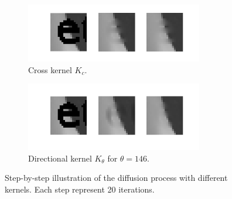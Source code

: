 \begin{figure}
	\centering
	\begin{subfigure}[b]{0.45\textwidth}
		\centering
		\includegraphics[clip, trim=0cm 1cm 0cm 0.5cm, width=0.85\textwidth]{figures/step-by-step-cross}
		\caption{Cross kernel $K_c$.}
	\end{subfigure}
	\begin{subfigure}[b]{0.45\textwidth}
		\centering
		\includegraphics[clip, trim=0cm 1cm 0cm 0.5cm, width=0.85\textwidth]{figures/step-by-step-directional}
		\caption{Directional kernel $K_\theta$ for $\theta = 146$.}
	\end{subfigure}
	\caption{Step-by-step illustration of the diffusion process with different kernels. Each step represent 20 iterations.}
\end{figure}